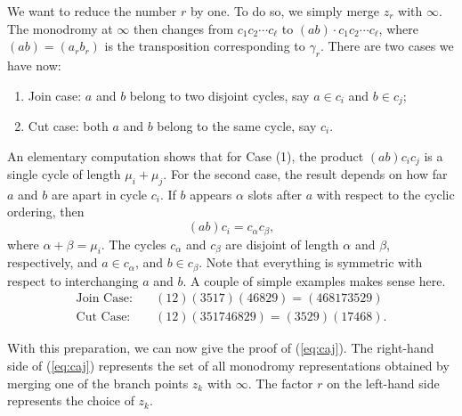\documentclass{amsart}
\theoremstyle{definition}
\numberwithin{equation}{section}
\numberwithin{figure}{section}
\def\a{\alpha}
\def\b{\beta}
\begin{document}
We want to reduce the number $r$ by one. To do so,
we simply merge $z_r$ with $\infty$. The monodromy
at $\infty$ then changes from $c_1 c_2\cdots c_\ell$
to $(ab)\cdot c_1 c_2\cdots c_\ell$, where
$(ab)=(a_rb_r)$ is the transposition corresponding to
$\gamma_r$. There are two cases we have now:
\begin{enumerate}
\item Join case: 
$a$ and $b$ belong to two disjoint cycles,
say $a\in c_i$ and $b\in c_j$;
\item Cut case: 
both $a$ and $b$ belong to the same cycle,
say $c_i$.
\end{enumerate}
An elementary computation shows that for Case (1), the product
$(ab)c_ic_j$ is a single cycle of length $\mu_i+\mu_j$.
For the second case, the result depends on how far
$a$ and $b$ are apart in cycle $c_i$. If $b$ appears
$\a$ slots after $a$ with respect to the 
cyclic ordering, then 
\begin{equation}
\label{eq:cut}
(ab)c_i = c_\a c_\b,
\end{equation}
where $\a+\b = \mu_i$. The cycles
$c_\a$ and $c_\b$ are disjoint  of length
$\a$ and $\b$, respectively, and  $a\in c_\a$,
and $b\in c_\b$. Note that everything is symmetric
with respect to interchanging $a$ and $b$.
A couple of simple examples makes sense here.
\begin{align*}
\text{Join Case:}\quad &(12)(3517)(46829) = (468173529)
\\
\text{Cut Case:}\quad &(12)(351746829) = (3529)(17468).
\end{align*}


With this preparation, we can now give the proof
of (\ref{eq:caj}).
The right-hand side of (\ref{eq:caj}) represents 
the set of all monodromy representations 
obtained by merging one of the branch points
$z_k$ with $\infty$. The factor $r$ on the
left-hand side represents 
the choice of $z_k$.
\end{document}
